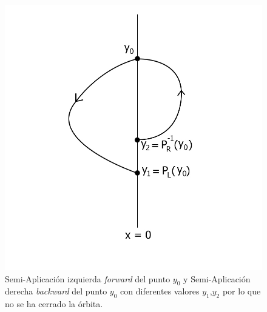 \documentclass[12pt,a4paper]{report} %
\begin{document}
	\begin{figure}[h]
		\centering
		\includegraphics[width=1\textwidth]{aplipoincareL-R.jpg}
		\caption{Semi-Aplicación izquierda \textit{forward} del punto $y_0$ y Semi-Aplicación derecha \textit{backward} del punto $y_0$ con diferentes valores $y_1$,$y_2$ por lo que no se ha cerrado la órbita.}
		\label{fig:aplipoincareL-R}
	\end{figure}\smallskip
	
	\newpage
	
\end{document}
